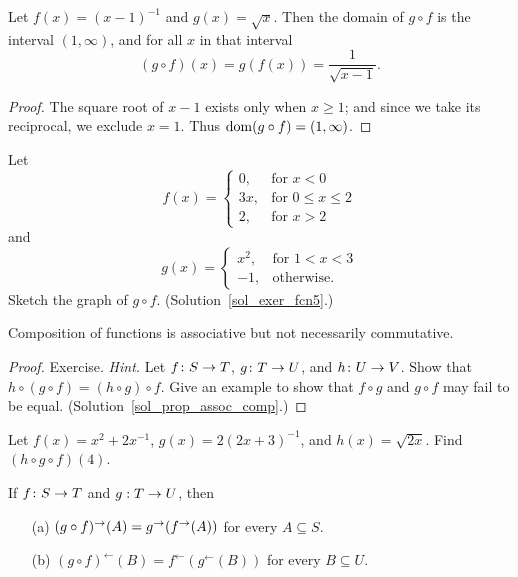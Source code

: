 \begin{exam}  Let $f(x) = (x - 1)^{-1}$ and $g(x) = \sqrt x$. Then
the domain of $g \circ f$ is the interval $(1,\infty)$, and for all
$x$ in that interval
  \[(g \circ f)(x) = g(f(x)) = \frac1{\sqrt{x - 1}}.\]
\end{exam}

\begin{proof} The square root of $x-1$ exists only when $x \ge 1$; and since we take its
reciprocal, we exclude $x=1$.  Thus $\operatorname{dom}(g \circ f) = (1,\infty)$.
\end{proof}

\begin{exer}\label{exer_fcn5}  Let
 \[f(x) =
      \begin{cases}  0,  &\text{for $x<0$}\\
                     3x, &\text{for $0 \le x \le 2$}\\
                     2,  &\text{for $x>2$}
      \end{cases}\]
and
 \[g(x) =
      \begin{cases} x^2, &\text{for $1<x<3$}\\
                    -1,  &\text{otherwise.}
      \end{cases}\]
Sketch the graph of $g \circ f$.  (Solution~\ref{sol_exer_fcn5}.)
\end{exer}

\begin{prop}\label{prop_assoc_comp}  Composition of functions is associative but not necessarily
commutative.
\end{prop}

\begin{proof} Exercise. \emph{Hint.} Let $f\colon S \rightarrow T$, $g\colon T \rightarrow U$,
and $h\colon U \rightarrow V$. Show that $h \circ (g \circ f) = (h \circ g) \circ f$. Give an example
to show that $f \circ g$ and $g \circ f$ may fail to be equal.
(Solution~\ref{sol_prop_assoc_comp}.) \ns
\end{proof}

\begin{prob} Let $f(x) = x^2 + 2x^{-1}$, $g(x) = 2(2x + 3)^{-1}$,
and $h(x) = \sqrt{2x}$. Find $(h \circ g \circ f)(4)$.
\end{prob}

\begin{prob}  If $f\colon S \rightarrow T$ and $g:T \rightarrow U$, then
 \begin{enumerate}
  \item[(a)] $(g \circ f)^{\rightarrow}(A) = g^{\rightarrow}(f^{\rightarrow}(A))$ for every $A \subseteq S$.
  \item[(b)] $(g \circ f)^{\gets}(B) = f^{\gets}(g^{\gets}(B))$ for every $B \subseteq U$.
 \end{enumerate}
\end{prob}








